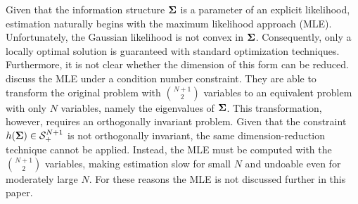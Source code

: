 \documentclass[11pt]{article}
\theoremstyle{definition}
\theoremstyle{definition}
\def\bSigma{{\bf \Sigma}}
\begin{document}
Given that the information structure $\bSigma$ is a parameter of an explicit likelihood, estimation naturally begins with the maximum likelihood approach (MLE).  Unfortunately, the Gaussian likelihood is not convex in $\bSigma$. Consequently, only a locally optimal solution is guaranteed with standard optimization techniques. 
Furthermore, it is not clear whether the dimension of this form can be reduced. \cite{won2006maximum} discuss the MLE under a condition number constraint. They are able to transform the original problem with $\binom{N+1}{2}$ variables to an equivalent problem with only $N$ variables, namely the eigenvalues of $\bSigma$. This transformation, however, requires an orthogonally invariant problem. Given that the constraint $h(\bSigma) \in \mathcal{S}_{+}^{N+1}$ is not orthogonally invariant, the same dimension-reduction technique cannot be applied. Instead, the MLE must be computed with the $\binom{N+1}{2}$ variables, making estimation slow for small $N$ and undoable even for moderately large $N$. For these reasons the MLE is not discussed further in this paper.




\end{document}
